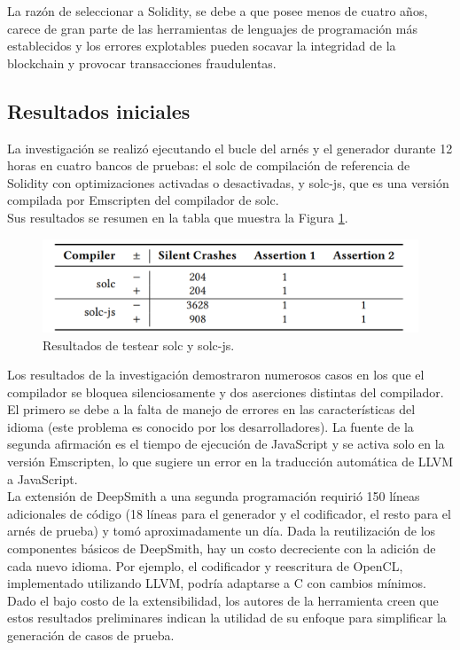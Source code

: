 La razón de seleccionar a Solidity, se debe a que posee menos de cuatro años, carece de gran parte de las herramientas de lenguajes de programación más establecidos y los errores explotables pueden socavar la integridad de la blockchain y provocar transacciones fraudulentas. 

\subsection{Resultados iniciales}
La investigación se realizó ejecutando el bucle del arnés y el generador durante 12 horas en cuatro bancos de pruebas: el solc de compilación de referencia de Solidity con optimizaciones activadas o desactivadas, y solc-js, que es una versión compilada por Emscripten del compilador de solc.\\

Sus resultados se resumen en la tabla que muestra la Figura \ref{fig:deepsmith solc}.

\begin{figure}[h]
    \centering
    \includegraphics[scale=0.3]{images/deepsmithsolc.png}
    \caption{Resultados de testear solc y solc-js.}
    \label{fig:deepsmith solc}
\end{figure}


Los resultados de la investigación demostraron numerosos casos en los que el compilador se bloquea silenciosamente y dos aserciones distintas del compilador. El primero se debe a la falta de manejo de errores en las características del idioma (este problema es conocido por los desarrolladores). La fuente de la segunda afirmación es el tiempo de ejecución de JavaScript y se activa solo en la versión Emscripten, lo que sugiere un error en la traducción automática de LLVM a JavaScript.\\

La extensión de DeepSmith a una segunda programación requirió 150 líneas adicionales de código (18 líneas para el generador y el codificador, el resto para el arnés de prueba) y tomó aproximadamente un día. Dada la reutilización de los componentes básicos de DeepSmith, hay un costo decreciente con la adición de cada nuevo idioma. Por ejemplo, el codificador y reescritura de OpenCL, implementado utilizando LLVM, podría adaptarse a C con cambios mínimos. Dado el bajo costo de la extensibilidad, los autores de la herramienta creen que estos resultados preliminares indican la utilidad de su enfoque para simplificar la generación de casos de prueba.

